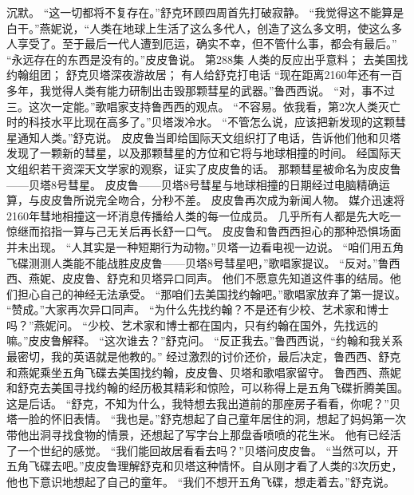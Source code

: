 \documentclass[a4paper,12pt,UTF8,twoside]{ctexbook}
\begin{document}
        沉默。  
        “这一切都将不复存在。”舒克环顾四周首先打破寂静。  
        “我觉得这不能算是白干。”燕妮说，“人类在地球上生活了这么多代人，创造了这么多文明，使这么多人享受了。至于最后一代人遭到厄运，确实不幸，但不管什么事，都会有最后。”  
        “永远存在的东西是没有的。”皮皮鲁说。          第288集  
        人类的反应出乎意料；  
        去美国找约翰组团；  
        舒克贝塔深夜游故居；  
        有人给舒克打电话    
        “现在距离2160年还有一百多年，我觉得人类有能力研制出击毁那颗彗星的武器。”鲁西西说。  
        “对，事不过三。这次一定能。”歌唱家支持鲁西西的观点。  
        “不容易。依我看，第2次人类灭亡时的科技水平比现在高多了。”贝塔泼冷水。  
        “不管怎么说，应该把新发现的这颗彗星通知人类。”舒克说。  
        皮皮鲁当即给国际天文组织打了电话，告诉他们他和贝塔发现了一颗新的彗星，以及那颗彗星的方位和它将与地球相撞的时间。        
        经国际天文组织若干资深天文学家的观察，证实了皮皮鲁的话。  
        那颗彗星被命名为皮皮鲁——贝塔8号彗星。  
        皮皮鲁——贝塔8号彗星与地球相撞的日期经过电脑精确运算，与皮皮鲁所说完全吻合，分秒不差。  
        皮皮鲁再次成为新闻人物。  
        媒介迅速将2160年彗地相撞这一坏消息传播给人类的每一位成员。  
        几乎所有人都是先大吃一惊继而掐指一算与己无关后再长舒一口气。  
        皮皮鲁和鲁西西担心的那种恐惧场面并未出现。  
        “人其实是一种短期行为动物。”贝塔一边看电视一边说。  
        “咱们用五角飞碟测测人类能不能战胜皮皮鲁——贝塔8号彗星吧，”歌唱家提议。  
        “反对。”鲁西西、燕妮、皮皮鲁、舒克和贝塔异口同声。  
        他们不愿意先知道这件事的结局。他们担心自己的神经无法承受。  
        “那咱们去美国找约翰吧。”歌唱家放弃了第一提议。  
        “赞成。”大家再次异口同声。  
        “为什么先找约翰？不是还有少校、艺术家和博士吗？”燕妮问。        
        “少校、艺术家和博士都在国内，只有约翰在国外，先找远的嘛。”皮皮鲁解释。  
        “这次谁去？”舒克问。  
        “反正我去。”鲁西西说，“约翰和我关系最密切，我的英语就是他教的。”  
        经过激烈的讨价还价，最后决定，鲁西西、舒克和燕妮乘坐五角飞碟去美国找约翰，皮皮鲁、贝塔和歌唱家留守。  
        鲁西西、燕妮和舒克去美国寻找约翰的经历极其精彩和惊险，可以称得上是五角飞碟折腾美国。这是后话。  
        “舒克，不知为什么，我特想去我出道前的那座房子看看，你呢？”贝塔一脸的怀旧表情。  
        “我也是。”舒克想起了自己童年居住的洞，想起了妈妈第一次带他出洞寻找食物的情景，还想起了写字台上那盘香喷喷的花生米。  
        他有已经活了一个世纪的感觉。  
        “我们能回故居看看去吗？”贝塔问皮皮鲁。  
        “当然可以，开五角飞碟去吧。”皮皮鲁理解舒克和贝塔这种情怀。自从刚才看了人类的3次历史，他也下意识地想起了自己的童年。  
        “我们不想开五角飞碟，想走着去。”舒克说。  
\end{document}
